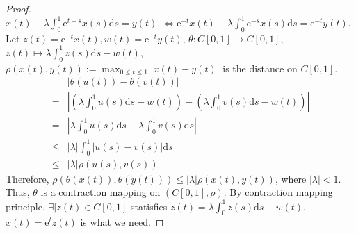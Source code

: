 \documentclass{ctexart}
\renewcommand{\(}{\left(}
\renewcommand{\)}{\right)}
\newcommand{\e}{\mathrm{e}}
\newcommand{\eleto}{\mapsto}
\begin{document}
\begin{proof}
 $x(t)-\lambda \int_0^1 \e^{t-s} x(s) \mathrm{d} s=y(t),\Leftrightarrow \e^{-t} x(t)-\lambda \int_0^1 \e^{-s} x(s) \mathrm{d} s=\e^{-t}y(t).$\\
 Let $z(t)=\e^{-t}x(t),w(t)=\e^{-t}y(t)$,  $\theta: C[0,1]\to C[0,1]$, $z(t)\eleto \lambda \int_0^1 z(s) \mathrm{d} s-w(t)$,  $\rho(x(t),y(t)):=\max_{0\leq t\leq 1}|x(t)-y(t)|$ is the distance on $C[0,1]$.
 \begin{equation}
    \begin{aligned}
        &|\theta(u(t))-\theta(v(t))|\\
        =&|(\lambda \int_0^1 u(s) \mathrm{d} s-w(t))-(\lambda \int_0^1 v(s) \mathrm{d} s-w(t))|\\
        =&|\lambda \int_0^1 u(s) \mathrm{d} s-\lambda \int_0^1 v(s) \mathrm{d} s|\\
        \leq&|\lambda |\int_0^1|u(s)-v(s)|\mathrm{d}  s\\
        \leq &|\lambda|\rho(u(s),v(s))
    \end{aligned}\end{equation}
    Therefore, $\rho(\theta(x(t)),\theta(y(t)))\leq |\lambda|\rho(x(t),y(t))$, where $|\lambda|<1$.
    Thus, $\theta$ is a contraction mapping on $(C[0,1],\rho)$. By contraction mapping principle, $\exists |z(t)\in C[0,1]$ statisfies $z(t)=\lambda \int_0^1 z(s) \mathrm{d} s-w(t)$. $x(t)=\e^{t}z(t)$ is what we need.
\end{proof}
\end{document}
